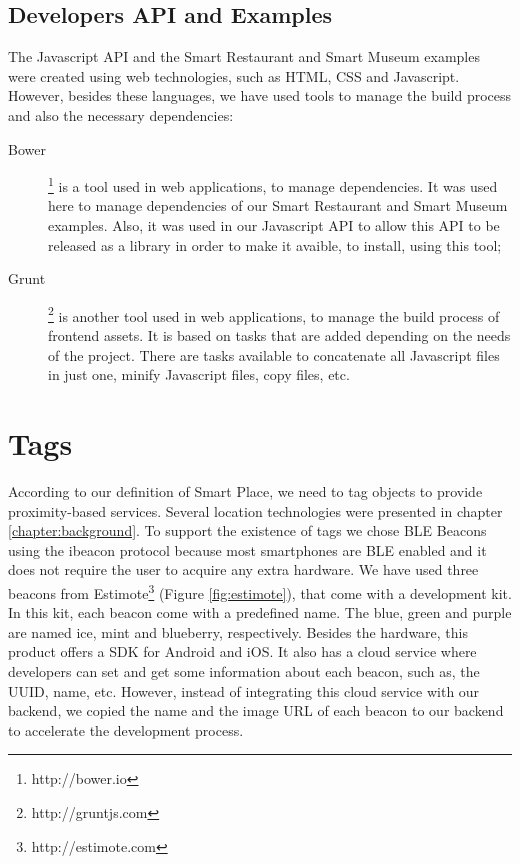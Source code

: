 \subsection{Developers \gls{API} and Examples}
\label{sub:implementation_tools_developers_api_and_examples}
The Javascript \gls{API} and the Smart Restaurant and Smart Museum examples were created using web technologies, such as \gls{HTML}, \gls{CSS} and Javascript.
However, besides these languages, we have used tools to manage the build process and also the necessary dependencies:
\begin{description}
  \item[Bower]\footnote{http://bower.io} is a tool used in web applications, to manage dependencies. It was used here to manage dependencies of our Smart Restaurant and Smart Museum examples.
  Also, it was used in our Javascript \gls{API} to allow this \gls{API} to be released as a library in order to make it avaible, to install, using this tool;
  \item[Grunt]\footnote{http://gruntjs.com} is another tool used in web applications, to manage the build process of frontend assets.
  It is based on tasks that are added depending on the needs of the project.
  There are tasks available to concatenate all Javascript files in just one, minify Javascript files, copy files, etc.
\end{description}

\section{Tags}
\label{sec:implementation_tags}
According to our definition of Smart Place, we need to tag objects to provide proximity-based services.
Several location technologies were presented in chapter \ref{chapter:background}.
To support the existence of tags we chose \gls{BLE} Beacons using the ibeacon protocol because most smartphones are \gls{BLE} enabled and it does not require the user to acquire any extra hardware.
We have used three beacons from Estimote\footnote{http://estimote.com}
(Figure \ref{fig:estimote}), that come with a development kit.
In this kit, each beacon come with a predefined name.
The blue, green and purple are named ice, mint and blueberry, respectively.
Besides the hardware, this product offers a \gls{SDK} for Android and
iOS. It also has a cloud service where developers can set and get
some information about each beacon, such as, the \gls{UUID}, name, etc.
However, instead of integrating this cloud service with our backend, we copied the name and the image \gls{URL} of each beacon to our backend to accelerate the development process.

